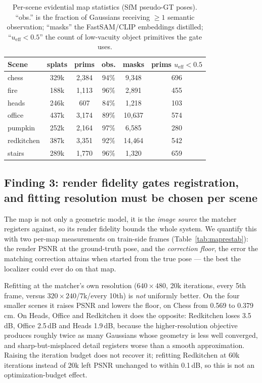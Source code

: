 \documentclass[journal]{IEEEtran}
\begin{document}
\begin{table}[t]
\caption{Per-scene evidential map statistics (SfM pseudo-GT poses).
``obs.'' is the fraction of Gaussians receiving $\ge 1$ semantic
observation; ``masks'' the FastSAM/CLIP embeddings distilled; ``$u_\text{eff}
{<}0.5$'' the count of low-vacuity object primitives the gate uses.}
\label{tab:mapstats}
\centering\scriptsize
\setlength{\tabcolsep}{3pt}
\begin{tabular}{@{}lccccc@{}}
\toprule
Scene & splats & prims & obs. & masks & prims $u_\text{eff}{<}0.5$ \\
\midrule
chess      & 329k & 2{,}384 & 94\% & 9{,}348  & 696 \\
fire       & 188k & 1{,}113 & 96\% & 2{,}891  & 455 \\
heads      & 246k & 607     & 84\% & 1{,}218  & 103 \\
office     & 437k & 3{,}174 & 89\% & 10{,}637 & 574 \\
pumpkin    & 252k & 2{,}164 & 97\% & 6{,}585  & 280 \\
redkitchen & 387k & 3{,}351 & 92\% & 14{,}464 & 542 \\
stairs     & 289k & 1{,}770 & 96\% & 1{,}320  & 659 \\
\bottomrule
\end{tabular}
\end{table}

\subsection{Finding 3: render fidelity gates registration, and fitting
resolution must be chosen per scene}
\label{sec:mapres}
The map is not only a geometric model, it is the \emph{image source} the
matcher registers against, so its render fidelity bounds the whole system.
We quantify this with two per-map measurements on train-side frames
(Table~\ref{tab:maprestab}): the render PSNR at the ground-truth pose, and
the \emph{correction floor}, the error the matching correction attains when
started from the true pose --- the best the localizer could ever do on that
map.

Refitting at the matcher's own resolution ($640{\times}480$, 20k iterations,
every 5th frame, versus $320{\times}240$/7k/every 10th) is \emph{not}
uniformly better. On the four smaller scenes it raises PSNR and lowers the
floor, on Chess from 0.569 to 0.379\,cm. On Heads, Office and Redkitchen it does the opposite: Redkitchen loses 3.5\,dB, Office 2.5\,dB and Heads 1.9\,dB, because the
higher-resolution objective produces roughly twice as many Gaussians whose
geometry is less well converged, and sharp-but-misplaced detail registers
worse than a smooth approximation. Raising the iteration budget does not
recover it; refitting Redkitchen at 60k iterations instead of 20k left PSNR unchanged to within 0.1\,dB, so this is not an optimization-budget effect.
\end{document}
